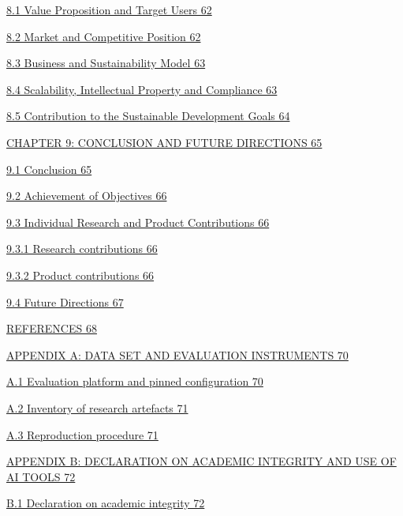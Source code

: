 \documentclass[
]{article}
\begin{document}
\protect\hyperlink{value-proposition-and-target-users}{8.1 Value
Proposition and Target Users 62}

\protect\hyperlink{market-and-competitive-position}{8.2 Market and
Competitive Position 62}

\protect\hyperlink{business-and-sustainability-model}{8.3 Business and
Sustainability Model 63}

\protect\hyperlink{scalability-intellectual-property-and-compliance}{8.4
Scalability, Intellectual Property and Compliance 63}

\protect\hyperlink{contribution-to-the-sustainable-development-goals}{8.5
Contribution to the Sustainable Development Goals 64}

\protect\hyperlink{chapter-9-conclusion-and-future-directions}{CHAPTER
9: CONCLUSION AND FUTURE DIRECTIONS 65}

\protect\hyperlink{conclusion}{9.1 Conclusion 65}

\protect\hyperlink{achievement-of-objectives}{9.2 Achievement of
Objectives 66}

\protect\hyperlink{individual-research-and-product-contributions}{9.3
Individual Research and Product Contributions 66}

\protect\hyperlink{research-contributions}{9.3.1 Research contributions
66}

\protect\hyperlink{product-contributions}{9.3.2 Product contributions
66}

\protect\hyperlink{future-directions}{9.4 Future Directions 67}

\protect\hyperlink{references}{REFERENCES 68}

\protect\hyperlink{appendix-a-data-set-and-evaluation-instruments}{APPENDIX
A: DATA SET AND EVALUATION INSTRUMENTS 70}

\protect\hyperlink{a.1-evaluation-platform-and-pinned-configuration}{A.1
Evaluation platform and pinned configuration 70}

\protect\hyperlink{a.2-inventory-of-research-artefacts}{A.2 Inventory of
research artefacts 71}

\protect\hyperlink{a.3-reproduction-procedure}{A.3 Reproduction
procedure 71}

\protect\hyperlink{appendix-b-declaration-on-academic-integrity-and-use-of-ai-tools}{APPENDIX
B: DECLARATION ON ACADEMIC INTEGRITY AND USE OF AI TOOLS 72}

\protect\hyperlink{b.1-declaration-on-academic-integrity}{B.1
Declaration on academic integrity 72}
\end{document}
